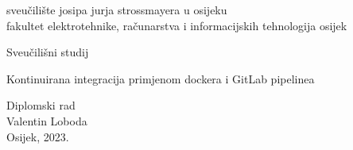 \documentclass[a4paper,12pt,oneside]{article}
\begin{document}

\setcounter{MaxMatrixCols}{20}                          %
\renewcommand{\baselinestretch}{1.5}                    %
\renewcommand{\thefigure}{\thesection.\arabic{figure}}  %
\renewcommand{\thetable}{\thesection.\arabic{table}}   %
\renewcommand{\theequation}{\thesection-\arabic{equation}} %
\renewcommand{\refname}{Literatura}						%






\begin{titlepage}

\begin{center}{\sc\Large sveu\v{c}ili\v{s}te josipa jurja strossmayera u osijeku}\\{\sc\Large fakultet elektrotehnike, ra\v{c}unarstva i informacijskih tehnologija osijek}\\
\bigskip

\vspace*{2cm}
{\large Sveučilišni studij}\\

\vspace*{7cm}

{\sc\LARGE Kontinuirana integracija primjenom dockera i GitLab pipelinea}

\vspace*{1cm}
{\large Diplomski rad}\\
\vspace*{3cm}
{\Large Valentin Loboda}\\
\vspace*{6cm}
{\normalsize Osijek, 2023.}
\end{center}

\end{titlepage}
\end{document}
